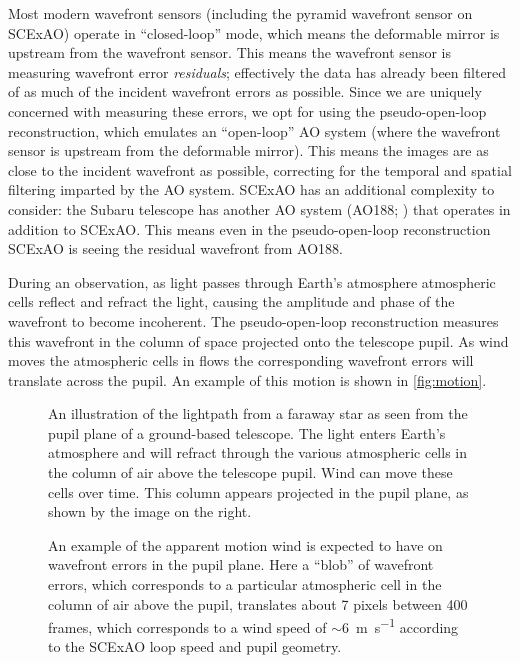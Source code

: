 Most modern wavefront sensors (including the pyramid wavefront sensor on SCExAO) operate in ``closed-loop'' mode, which means the deformable mirror is upstream from the wavefront sensor. This means the wavefront sensor is measuring wavefront error \textit{residuals}; effectively the data has already been filtered of as much of the incident wavefront errors as possible. Since we are uniquely concerned with measuring these errors, we opt for using the pseudo-open-loop reconstruction, which emulates an ``open-loop'' AO system (where the wavefront sensor is upstream from the deformable mirror). This means the images are as close to the incident wavefront as possible, correcting for the temporal and spatial filtering imparted by the AO system. SCExAO has an additional complexity to consider: the Subaru telescope has another AO system (AO188; \citealp{2010SPIE.7736E..0NH}) that operates in addition to SCExAO. This means even in the pseudo-open-loop reconstruction SCExAO is seeing the residual wavefront from AO188.

During an observation, as light passes through Earth's atmosphere atmospheric cells reflect and refract the light, causing the amplitude and phase of the wavefront to become incoherent. The pseudo-open-loop reconstruction measures this wavefront in the column of space projected onto the telescope pupil. As wind moves the atmospheric cells in flows the corresponding wavefront errors will translate across the pupil. An example of this motion is shown in \autoref{fig:motion}.

\begin{figure}
    \centering
    \caption{An illustration of the lightpath from a faraway star as seen from the pupil plane of a ground-based telescope. The light enters Earth's atmosphere and will refract through the various atmospheric cells in the column of air above the telescope pupil. Wind can move these cells over time. This column appears projected in the pupil plane, as shown by the image on the right.}
    \label{fig:pupil}
\end{figure}


\begin{figure}
    \centering
    \caption{An example of the apparent motion wind is expected to have on wavefront errors in the pupil plane. Here a ``blob'' of wavefront errors, which corresponds to a particular atmospheric cell in the column of air above the pupil, translates about 7 pixels between 400 frames, which corresponds to a wind speed of $\sim$\SI{6}{\meter\per\second} according to the SCExAO loop speed and pupil geometry.}
    \label{fig:motion}
\end{figure}

